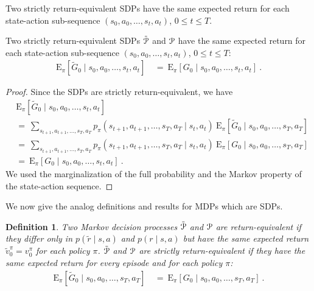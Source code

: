 \documentclass{article}
\newtheorem{definitionA}{Definition}
\newcommand\EXP{\mathbf{\mathrm{E}}}
\renewcommand{\leq}{\leqslant}
\begin{document}
\begin{appendices}
Two strictly return-equivalent SDPs have the same 
expected return for each state-action sub-sequence
$(s_0,a_0,\ldots,s_t,a_t)$, $0 \leq t \leq T$.
\begin{lemmaA}
\label{th:AreturnSub}
Two strictly return-equivalent SDPs $\tilde{\mathcal{P}}$ and $\mathcal{P}$
have the same expected return for each
state-action sub-sequence
$(s_0,a_0,\ldots,s_t,a_t)$, $0 \leq t \leq T$:
\begin{align}
   \EXP_{\pi} \left[
    \tilde{G}_0 \mid s_0,a_0,\ldots,s_t,a_t \right] \ &= \
   \EXP_{\pi} \left[
    G_0 \mid s_0,a_0,\ldots,s_t, a_t\right] \ .
  \end{align}
\end{lemmaA}
\begin{proof}
Since the SDPs are strictly return-equivalent, we have
\begin{align}
   &\EXP_{\pi} \left[
    \tilde{G}_0 \mid s_0,a_0,\ldots,s_t,a_t \right] \\ \nonumber
    &= \ \sum_{s_{t+1},a_{t+1},\ldots,s_T,a_T} 
    p_{\pi} (s_{t+1},a_{t+1},\ldots,s_T,a_T \mid s_t,a_t) \
    \EXP_{\pi} \left[
    \tilde{G}_0 \mid s_0,a_0,\ldots,s_T,a_T \right] \\ \nonumber
    &= \ \sum_{s_{t+1},a_{t+1},\ldots,s_T,a_T} 
    p_{\pi} (s_{t+1},a_{t+1},\ldots,s_T,a_T \mid s_t,a_t) \
    \EXP_{\pi} \left[
    G_0 \mid s_0,a_0,\ldots,s_T,a_T \right] \\ \nonumber
    &= \    \EXP_{\pi} \left[
    G_0 \mid s_0,a_0,\ldots,s_t, a_t\right] \ .
  \end{align}
We used the marginalization of the full probability and
the Markov property of the state-action sequence.
\end{proof}

We now give the analog definitions and
results for MDPs which are SDPs.
\begin{definitionA}
  \label{def:AreturnEq}
  Two Markov decision processes $\tilde{\mathcal{P}}$ and $\mathcal{P}$
  are {\em return-equivalent} if
  they differ only in $p(\tilde{r} \mid s,a)$ and $p(r \mid s,a)$ but
  have the same expected return
  $\tilde{v}^{\pi}_0=v^{\pi}_0$ for each policy $\pi$.
  $\tilde{\mathcal{P}}$ and $\mathcal{P}$ 
  are {\em strictly return-equivalent} if
  they have the same expected return for every episode and
  for each policy $\pi$:
  \begin{align}
   \EXP_{\pi} \left[
    \tilde{G}_0 \mid s_0,a_0,\ldots,s_T,a_T \right] \ &= \
   \EXP_{\pi} \left[
    G_0 \mid s_0,a_0,\ldots,s_T, a_T\right] \ .
  \end{align}
\end{definitionA}


\end{appendices}
\end{document}
